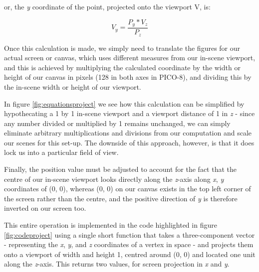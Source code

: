 \documentclass{article}
\begin{document}
or, the \textit{y} coordinate of the point, projected onto the viewport V, is:

\begin{equation}
   V_y = \frac{P_y * V_z} {P_z}
\end{equation}

Once this calculation is made, we simply need to translate the figures for our actual screen or canvas, which uses different
measures from our in-scene viewport, and this is achieved by multiplying the calculated coordinate by the width or height of
our canvas in pixels (128 in both axes in PICO-8), and dividing this by the in-scene width or height of our viewport.

In figure \ref{fig:equationsproject} we see how this calculation can be simplified by hypothecating a 1 by 1 in-scene viewport and
a viewport distance of 1 in \textit{z} - since any number divided or multiplied by 1 remains unchanged, we can simply eliminate
arbitrary multiplications and divisions from our computation and scale our scenes for this set-up. The downside of this approach,
however, is that it does lock us into a particular field of view.

Finally, the position value must be adjusted to account for the fact that the centre of our in-scene viewport looks directly
along the \textit{z}-axis along \textit{x}, \textit{y} coordinates of (0, 0), whereas (0, 0) on our canvas exists
in the top left corner of the screen rather than the centre, and the positive direction of \textit{y} is therefore
inverted on our screen too.

This entire operation is implemented in the code highlighted in figure \ref{fig:codeproject} using a single short function
that takes a three-component vector - representing the \textit{x}, \textit{y}, and \textit{z} coordinates of a
vertex in space - and projects them onto a viewport of width and height 1, centred around (0, 0) and located
one unit along the \textit{z}-axis. This returns two values, for screen projection in \textit{x} and \textit{y}.
\end{document}
